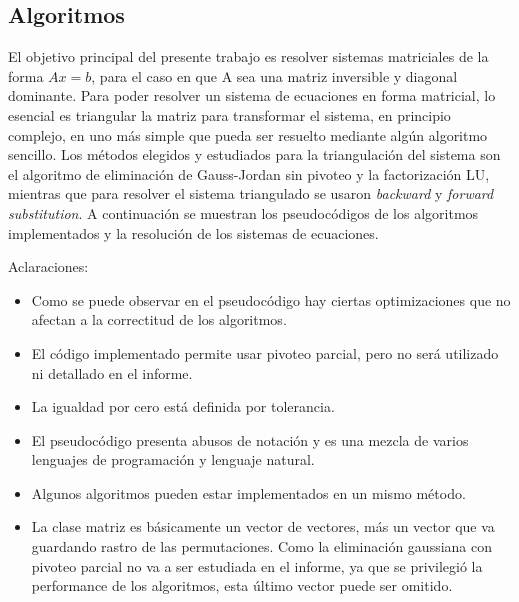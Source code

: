 \subsection{Algoritmos}

El objetivo principal del presente trabajo es resolver sistemas matriciales de la forma $Ax = b$, para el caso en que A sea una matriz inversible y diagonal dominante. Para poder resolver un sistema de ecuaciones en forma matricial, lo esencial es triangular la matriz para transformar el sistema, en principio complejo, en uno más simple que pueda ser resuelto mediante algún algoritmo sencillo.
Los métodos elegidos y estudiados para la triangulación del sistema son el algoritmo de eliminación de Gauss-Jordan sin pivoteo y la factorización LU, mientras que para resolver el sistema triangulado se usaron \emph{backward} y \emph{forward} \emph{substitution}. A continuación se muestran los pseudocódigos de los algoritmos implementados y la resolución de los sistemas de ecuaciones.



Aclaraciones:
\begin{itemize}
\item Como se puede observar en el pseudocódigo hay ciertas optimizaciones que no afectan a la correctitud de los algoritmos.
\item El código implementado permite usar pivoteo parcial, pero no será utilizado ni detallado en el informe.
\item La igualdad por cero está definida por tolerancia.
\item El pseudocódigo presenta abusos de notación y es una mezcla de varios lenguajes de programación y lenguaje natural.
\item Algunos algoritmos pueden estar implementados en un mismo método.
\item La clase matriz es básicamente un vector de vectores, más un vector que va guardando rastro de las permutaciones. Como la eliminación gaussiana con pivoteo parcial no va a ser estudiada en el informe, ya que se privilegió la performance de los algoritmos, esta último vector puede ser omitido.
\end{itemize}







